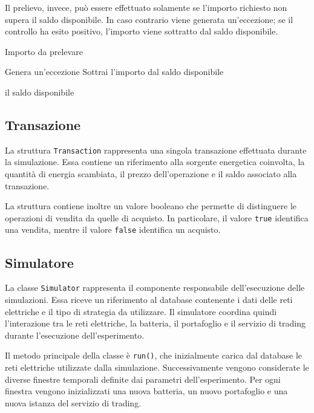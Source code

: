 \documentclass[a4paper,oneside,italian]{sapthesis}
\begin{document}
Il prelievo, invece, può essere effettuato solamente se l'importo richiesto
non supera il saldo disponibile. In caso contrario viene generata
un'eccezione; se il controllo ha esito positivo, l'importo viene sottratto
dal saldo disponibile.

\begin{algorithm}[H]
\caption{Prelievo dal portafoglio}
\label{alg:wallet-withdraw}
\begin{algorithmic}[1]

\Require Importo da prelevare

    \State Genera un'eccezione
\Else
    \State Sottrai l'importo dal saldo disponibile
\EndIf

\State \Return il saldo disponibile

\end{algorithmic}
\end{algorithm}

\subsection{Transazione}

La struttura \texttt{Transaction} rappresenta una singola transazione
effettuata durante la simulazione. Essa contiene un riferimento alla
sorgente energetica coinvolta, la quantità di energia scambiata, il prezzo
dell'operazione e il saldo associato alla transazione.

La struttura contiene inoltre un valore booleano che permette di distinguere
le operazioni di vendita da quelle di acquisto. In particolare, il valore
\texttt{true} identifica una vendita, mentre il valore \texttt{false}
identifica un acquisto.

\subsection{Simulatore}

La classe \texttt{Simulator} rappresenta il componente responsabile
dell'esecuzione delle simulazioni. Essa riceve un riferimento al database
contenente i dati delle reti elettriche e il tipo di strategia da utilizzare.
Il simulatore coordina quindi l'interazione tra le reti elettriche, la
batteria, il portafoglio e il servizio di trading durante l'esecuzione
dell'esperimento.

Il metodo principale della classe è \texttt{run()}, che inizialmente carica
dal database le reti elettriche utilizzate dalla simulazione. Successivamente
vengono considerate le diverse finestre temporali definite dai parametri
dell'esperimento. Per ogni finestra vengono inizializzati una nuova batteria,
un nuovo portafoglio e una nuova istanza del servizio di trading.
\end{document}
